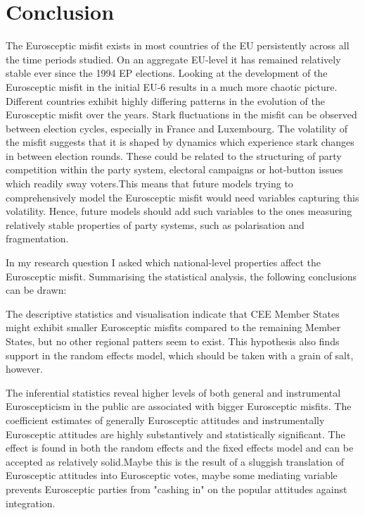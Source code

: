 \chapter{Conclusion}
The Eurosceptic misfit exists in most countries of the EU persistently across all the time periods studied. On an aggregate EU-level it has remained relatively stable ever since the 1994 EP elections. Looking at the development of the Eurosceptic misfit in the initial EU-6 results in a much more chaotic picture. Different countries exhibit highly differing patterns in the evolution of the Eurosceptic misfit over the years. Stark fluctuations in the misfit can be observed between election cycles, especially in France and Luxembourg.  The volatility of the misfit suggests that it is shaped by dynamics which experience stark changes in between election rounds. These could be related to the structuring of party competition within the party system, electoral campaigns or hot-button issues which readily sway voters.This means that future models trying to comprehensively model the Eurosceptic misfit would need variables capturing this volatility. Hence, future models should add such variables to the ones measuring relatively stable properties of party systems, such as polarisation and fragmentation.

In my research question I asked which national-level properties affect the Eurosceptic misfit. Summarising the statistical analysis, the following conclusions can be drawn: 

The descriptive statistics and visualisation indicate that CEE Member States might exhibit smaller Eurosceptic misfits compared to the remaining Member States, but no other regional patters seem to exist. This hypothesis also finds support in the random effects model, which should be taken with a grain of salt, however.

The inferential statistics reveal higher levels of both general and instrumental Euroscepticism in the public are associated with bigger Eurosceptic misfits. The coefficient estimates of generally Eurosceptic attitudes and instrumentally Eurosceptic attitudes are highly substantively and statistically significant. The effect is found in both the random effects and the fixed effects model and can be accepted as relatively solid.Maybe this is the result of a sluggish translation of Eurosceptic attitudes into Eurosceptic votes, maybe some mediating variable prevents Eurosceptic parties from "cashing in" on the popular attitudes against integration. 


